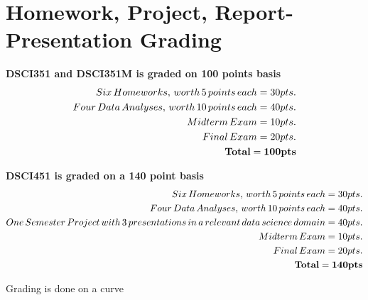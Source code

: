 \documentclass[11pt]{article} %
\begin{document}
\section{Homework, Project, Report-Presentation Grading}

  {\bf DSCI351 and DSCI351M is graded on 100 points basis}
  \begin{align*}
    Six \, Homeworks, \, worth \, 5 \, points \, each = 30 pts.\\
    Four \, Data \, Analyses, \, worth \, 10 \, points \, each = 40 pts.\\
    Midterm \, Exam = 10 pts.\\
    Final \, Exam = 20 pts. \\
    {\bf Total = 100 pts}
  \end{align*}
  
  {\bf DSCI451 is graded on a 140 point basis}
  \begin{align*}
    Six \, Homeworks, \, worth \, 5 \, points \, each = 30 pts.\\
    Four \, Data \, Analyses, \, worth \, 10 \, points \, each = 40 pts.\\
    One \,Semester \,Project \,with \,3 \,presentations \,in \,a \,relevant \,data \,science \,domain = 40 pts.\\
    Midterm \, Exam = 10 pts.\\
    Final \, Exam = 20 pts. \\
    {\bf Total = 140 pts}
  \end{align*}
  
  Grading is done on a curve
  
\end{document}
